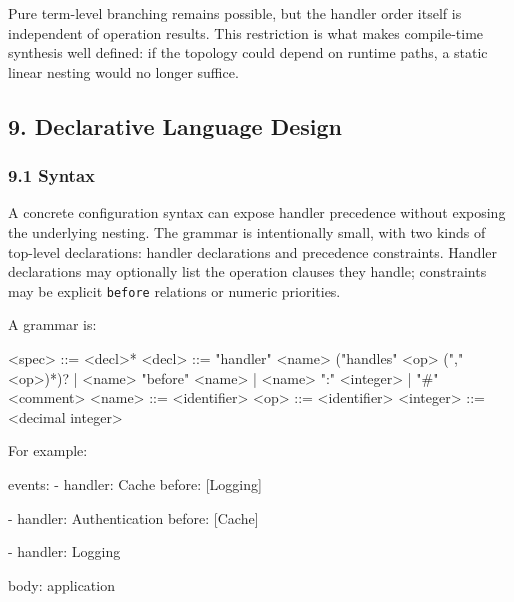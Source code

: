 \documentclass[
  11pt,
]{article}
\newenvironment{Shaded}{}{}
\newcommand{\NormalTok}[1]{#1}
\begin{document}
Pure term-level branching remains possible, but the handler order itself
is independent of operation results. This restriction is what makes
compile-time synthesis well defined: if the topology could depend on
runtime paths, a static linear nesting would no longer suffice.

\subsection{9. Declarative Language
Design}\label{declarative-language-design}

\subsubsection{9.1 Syntax}\label{syntax}

A concrete configuration syntax can expose handler precedence without
exposing the underlying nesting. The grammar is intentionally small,
with two kinds of top-level declarations: handler declarations and
precedence constraints. Handler declarations may optionally list the
operation clauses they handle; constraints may be explicit
\texttt{before} relations or numeric priorities.

A grammar is:

\begin{Shaded}
\begin{Highlighting}[]
\NormalTok{\textless{}spec\textgreater{}      ::= \textless{}decl\textgreater{}*}
\NormalTok{\textless{}decl\textgreater{}      ::= "handler" \textless{}name\textgreater{} ("handles" \textless{}op\textgreater{} ("," \textless{}op\textgreater{})*)?}
\NormalTok{              | \textless{}name\textgreater{} "before" \textless{}name\textgreater{}}
\NormalTok{              | \textless{}name\textgreater{} ":" \textless{}integer\textgreater{}}
\NormalTok{              | "\#" \textless{}comment\textgreater{}}
\NormalTok{\textless{}name\textgreater{}      ::= \textless{}identifier\textgreater{}}
\NormalTok{\textless{}op\textgreater{}        ::= \textless{}identifier\textgreater{}}
\NormalTok{\textless{}integer\textgreater{}   ::= \textless{}decimal integer\textgreater{}}
\end{Highlighting}
\end{Shaded}

For example:

\begin{Shaded}
\begin{Highlighting}[]
\NormalTok{events:}
\NormalTok{  {-} handler: Cache}
\NormalTok{    before: [Logging]}

\NormalTok{  {-} handler: Authentication}
\NormalTok{    before: [Cache]}

\NormalTok{  {-} handler: Logging}

\NormalTok{body:}
\NormalTok{  application}
\end{Highlighting}
\end{Shaded}
\end{document}
